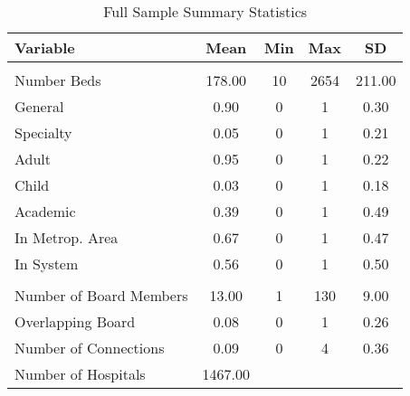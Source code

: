 \begin{table}[ht!]

\caption{Full Sample Summary Statistics\label{all_sumstats}}
\centering
\begin{tabular}[t]{lcccc}
\toprule
Variable & Mean & Min & Max & SD\\
\midrule
\addlinespace[0.3em]
\multicolumn{5}{l}{\textbf{Characteristics}}\\
\hspace{1em}Number Beds & 178.00 & 10 & 2654 & 211.00\\
\hspace{1em}General & 0.90 & 0 & 1 & 0.30\\
\hspace{1em}Specialty & 0.05 & 0 & 1 & 0.21\\
\hspace{1em}Adult & 0.95 & 0 & 1 & 0.22\\
\hspace{1em}Child & 0.03 & 0 & 1 & 0.18\\
\hspace{1em}Academic & 0.39 & 0 & 1 & 0.49\\
\hspace{1em}In Metrop. Area & 0.67 & 0 & 1 & 0.47\\
\hspace{1em}In System & 0.56 & 0 & 1 & 0.50\\
\addlinespace[0.3em]
\multicolumn{5}{l}{\textbf{Board Characteristics}}\\
\hspace{1em}Number of Board Members & 13.00 & 1 & 130 & 9.00\\
\hspace{1em}Overlapping Board & 0.08 & 0 & 1 & 0.26\\
Number of Connections & 0.09 & 0 & 4 & 0.36\\
Number of Hospitals & 1467.00 &  &  & \\
\bottomrule
\end{tabular}
\end{table}
